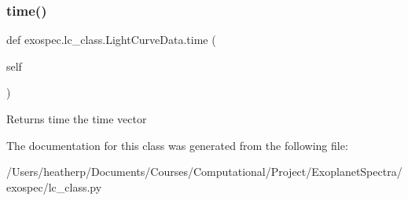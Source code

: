 \subsubsection{\texorpdfstring{time()}{time()}}
{\footnotesize\ttfamily def exospec.\+lc\+\_\+class.\+Light\+Curve\+Data.\+time (\begin{DoxyParamCaption}\item[{}]{self }\end{DoxyParamCaption})}

\begin{DoxyReturn}{Returns}
time the time vector 
\end{DoxyReturn}


The documentation for this class was generated from the following file\+:\begin{DoxyCompactItemize}
\item 
/\+Users/heatherp/\+Documents/\+Courses/\+Computational/\+Project/\+Exoplanet\+Spectra/exospec/lc\+\_\+class.\+py\end{DoxyCompactItemize}
